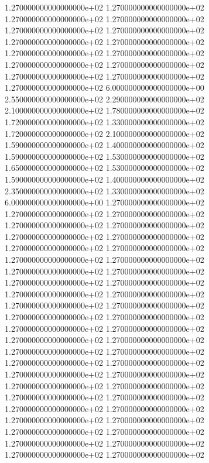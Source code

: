 1.270000000000000000e+02 1.270000000000000000e+02 1.270000000000000000e+02 1.270000000000000000e+02 1.270000000000000000e+02 1.270000000000000000e+02 1.270000000000000000e+02 1.270000000000000000e+02 1.270000000000000000e+02 1.270000000000000000e+02 1.270000000000000000e+02 1.270000000000000000e+02 1.270000000000000000e+02 1.270000000000000000e+02 1.270000000000000000e+02 6.000000000000000000e+00 2.550000000000000000e+02 2.290000000000000000e+02 2.100000000000000000e+02 1.780000000000000000e+02 1.720000000000000000e+02 1.330000000000000000e+02 1.720000000000000000e+02 2.100000000000000000e+02 1.590000000000000000e+02 1.400000000000000000e+02 1.590000000000000000e+02 1.530000000000000000e+02 1.650000000000000000e+02 1.530000000000000000e+02 1.590000000000000000e+02 1.400000000000000000e+02 2.350000000000000000e+02 1.330000000000000000e+02 6.000000000000000000e+00 1.270000000000000000e+02 1.270000000000000000e+02 1.270000000000000000e+02 1.270000000000000000e+02 1.270000000000000000e+02 1.270000000000000000e+02 1.270000000000000000e+02 1.270000000000000000e+02 1.270000000000000000e+02 1.270000000000000000e+02 1.270000000000000000e+02 1.270000000000000000e+02 1.270000000000000000e+02 1.270000000000000000e+02 1.270000000000000000e+02 1.270000000000000000e+02 1.270000000000000000e+02 1.270000000000000000e+02 1.270000000000000000e+02 1.270000000000000000e+02 1.270000000000000000e+02 1.270000000000000000e+02 1.270000000000000000e+02 1.270000000000000000e+02 1.270000000000000000e+02 1.270000000000000000e+02 1.270000000000000000e+02 1.270000000000000000e+02 1.270000000000000000e+02 1.270000000000000000e+02 1.270000000000000000e+02 1.270000000000000000e+02 1.270000000000000000e+02 1.270000000000000000e+02 1.270000000000000000e+02 1.270000000000000000e+02 1.270000000000000000e+02 1.270000000000000000e+02 1.270000000000000000e+02 1.270000000000000000e+02 1.270000000000000000e+02 1.270000000000000000e+02 1.270000000000000000e+02 1.270000000000000000e+02 1.270000000000000000e+02
